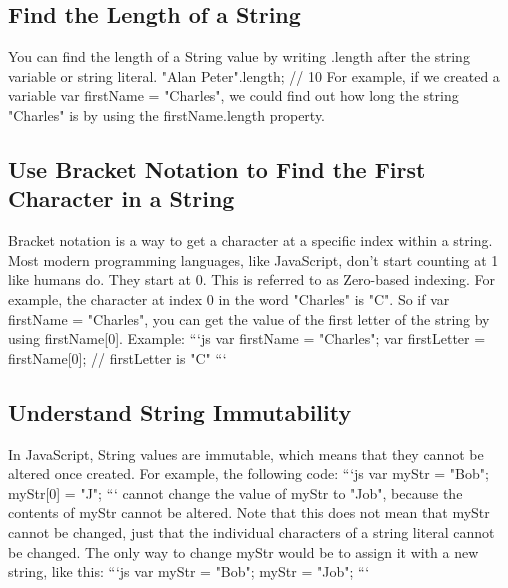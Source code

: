\documentclass{article}%
\begin{document}
%
\subsection{Find the Length of a String}%
\label{subsec:FindtheLengthofaString}%
You can find the length of a String value by writing .length after the string variable or string literal.\newline%
"Alan Peter".length; // 10\newline%
For example, if we created a variable var firstName = "Charles", we could find out how long the string "Charles" is by using the firstName.length property.\newline%

%
\subsection{Use Bracket Notation to Find the First Character in a String}%
\label{subsec:UseBracketNotationtoFindtheFirstCharacterinaString}%
Bracket notation is a way to get a character at a specific index within a string.\newline%
Most modern programming languages, like JavaScript, don't start counting at 1 like humans do. They start at 0. This is referred to as Zero{-}based indexing.\newline%
For example, the character at index 0 in the word "Charles" is "C". So if var firstName = "Charles", you can get the value of the first letter of the string by using firstName{[}0{]}.\newline%
Example:\newline%
```js\newline%
var firstName = "Charles";\newline%
var firstLetter = firstName{[}0{]}; // firstLetter is "C"\newline%
```\newline%

%
\subsection{Understand String Immutability}%
\label{subsec:UnderstandStringImmutability}%
In JavaScript, String values are immutable, which means that they cannot be altered once created.\newline%
For example, the following code:\newline%
```js\newline%
var myStr = "Bob";\newline%
myStr{[}0{]} = "J";\newline%
```\newline%
cannot change the value of myStr to "Job", because the contents of myStr cannot be altered. Note that this does not mean that myStr cannot be changed, just that the individual characters of a string literal cannot be changed. The only way to change myStr would be to assign it with a new string, like this:\newline%
```js\newline%
var myStr = "Bob";\newline%
myStr = "Job";\newline%
```\newline%
\end{document}
